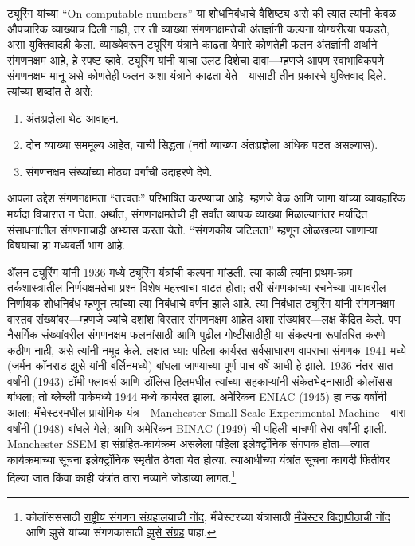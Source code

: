 \documentclass[../../../include/open-logic-section]{subfiles}
\begin{document}
\begin{digress}
ट्यूरिंग यांच्या ``On computable numbers'' या शोधनिबंधाचे वैशिष्ट्य
असे की त्यात त्यांनी केवळ औपचारिक व्याख्याच दिली नाही, तर ती व्याख्या
संगणनक्षमतेची अंतर्ज्ञानी कल्पना योग्यरीत्या पकडते, असा युक्तिवादही
केला. व्याख्येवरून ट्यूरिंग यंत्राने काढता येणारे कोणतेही फलन अंतर्ज्ञानी
अर्थाने संगणनक्षम आहे, हे स्पष्ट व्हावे. ट्यूरिंग यांनी याचा उलट
दिशेचा दावा---म्हणजे आपण स्वाभाविकपणे संगणनक्षम मानू असे कोणतेही फलन
अशा यंत्राने काढता येते---यासाठी तीन प्रकारचे युक्तिवाद दिले. त्यांच्या
शब्दांत ते असे:
\begin{enumerate}
\item अंतःप्रज्ञेला थेट आवाहन.
\item दोन व्याख्या सममूल्य आहेत, याची सिद्धता (नवी व्याख्या
  अंतःप्रज्ञेला अधिक पटत असल्यास).
\item संगणनक्षम संख्यांच्या मोठ्या वर्गांची उदाहरणे देणे.
\end{enumerate}
आपला उद्देश संगणनक्षमता ``तत्त्वतः'' परिभाषित करण्याचा आहे: म्हणजे
वेळ आणि जागा यांच्या व्यावहारिक मर्यादा विचारात न घेता. अर्थात,
संगणनक्षमतेची ही सर्वांत व्यापक व्याख्या मिळाल्यानंतर मर्यादित
संसाधनांतील संगणनाचाही अभ्यास करता येतो. ``संगणकीय जटिलता'' म्हणून
ओळखल्या जाणाऱ्या विषयाचा हा मध्यवर्ती भाग आहे.
\end{digress}

\begin{history}
ॲलन ट्यूरिंग यांनी 1936 मध्ये ट्यूरिंग यंत्रांची कल्पना मांडली.
त्या काळी त्यांना प्रथम-क्रम तर्कशास्त्रातील निर्णयक्षमतेचा प्रश्न
विशेष महत्त्वाचा वाटत होता; तरी संगणकाच्या रचनेच्या पायावरील निर्णायक
शोधनिबंध म्हणून त्यांच्या त्या निबंधाचे वर्णन झाले आहे. त्या निबंधात
ट्यूरिंग यांनी संगणनक्षम वास्तव संख्यांवर---म्हणजे ज्यांचे दशांश
विस्तार संगणनक्षम आहेत अशा संख्यांवर---लक्ष केंद्रित केले. पण
नैसर्गिक संख्यांवरील संगणनक्षम फलनांसाठी आणि पुढील गोष्टींसाठीही या
संकल्पना रूपांतरित करणे कठीण नाही, असे त्यांनी नमूद केले. लक्षात घ्या:
पहिला कार्यरत सर्वसाधारण वापराचा संगणक 1941 मध्ये (जर्मन कॉनराड
झुसे यांनी बर्लिनमध्ये) बांधला जाण्याच्या पूर्ण पाच
वर्षे आधी हे झाले. 1936 नंतर सात वर्षांनी (1943) टॉमी फ्लावर्स आणि
डॉलिस हिलमधील त्यांच्या सहकाऱ्यांनी संकेतभेदनासाठी कोलॉसस बांधला;
तो ब्लेच्ली पार्कमध्ये 1944 मध्ये कार्यरत झाला.
अमेरिकन ENIAC
(1945) हा नऊ वर्षांनी आला; मँचेस्टरमधील प्रायोगिक
यंत्र---Manchester Small-Scale Experimental Machine---बारा
वर्षांनी (1948) बांधले गेले; आणि अमेरिकन BINAC (1949) ची पहिली
चाचणी तेरा वर्षांनी झाली. Manchester SSEM हा संग्रहित-कार्यक्रम
असलेला पहिला इलेक्ट्रॉनिक संगणक होता---त्यात कार्यक्रमाच्या सूचना
इलेक्ट्रॉनिक स्मृतीत ठेवता येत होत्या. त्याआधीच्या यंत्रांत सूचना
कागदी फितीवर दिल्या जात किंवा काही यंत्रांत तारा नव्याने जोडाव्या लागत.\footnote{कोलॉसससाठी \href{https://www.tnmoc.org/colossus}{राष्ट्रीय संगणन संग्रहालयाची नोंद}, मँचेस्टरच्या यंत्रासाठी \href{https://www.manchester.ac.uk/about/news/university-celebrates-babys-65th-birthday/}{मँचेस्टर विद्यापीठाची नोंद} आणि झुसे यांच्या संगणकासाठी \href{https://zuse.zib.de/z1}{झुसे संग्रह} पाहा.}
%
\end{history}
\end{document}
